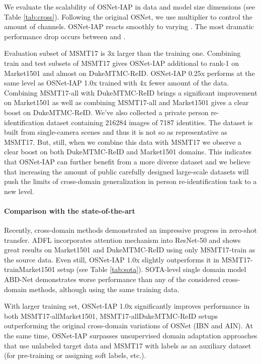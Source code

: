 \documentclass[a4paper,conference]{IEEEtran}
\begin{document}
We evaluate the scalability of OSNet-IAP in data and model size dimensions (see
Table \ref{tab:cross}).  Following the original OSNet, we use multiplier
 to control the amount of channels. OSNet-IAP
reacts smoothly to varying . The most dramatic performance drop occurs
between  and .

Evaluation subset of MSMT17 is 3x larger than the training one. Combining train
and test subsets of MSMT17 gives OSNet-IAP additional  to rank-1 on
Market1501 and almost  on DukeMTMC-ReID. OSNet-IAP 0.25x performs at the
same level as OSNet-IAP 1.0x trained with 4x fewer amount of the data. Combining
MSMT17-all with DukeMTMC-ReID brings a significant improvement on Market1501 as
well as combining MSMT17-all and Market1501 gives a clear boost on
DukeMTMC-ReID. We've also collected a private person re-identification dataset
containing 216284 images of 7187 identities. The dataset is built from
single-camera scenes and thus it is not so as representative as MSMT17. But,
still, when we combine this data with MSMT17 we observe a clear boost on both
DukeMTMC-ReID and Market1501 domains. This indicates that OSNet-IAP can further
benefit from a more diverse dataset and we believe that increasing the amount
of public carefully designed large-scale datasets will push the limits of cross-domain
generalization in person re-identification task to a new level.

\paragraph{Comparison with the state-of-the-art}\label{para:compare_sota}

Recently, cross-domain methods demonstrated an impressive progress in zero-shot
transfer. ADFL \cite{Liu2019AttentionAB} incorporates attention mechanism into ResNet-50 and
shows great results on Market1501 and DukeMTMC-ReID using only MSMT17-train as the source data. Even still,
OSNet-IAP 1.0x slightly outperforms it in MSMT17-trainMarket1501
setup (see Table \ref{tab:sota}). SOTA-level single domain model
ABD-Net \cite{abd} demonstrates worse performance than any of the considered cross-domain methods,
although using the same training data.

With larger training set, OSNet-IAP 1.0x significantly improves performance in
both MSMT17-allMarket1501, MSMT17-allDukeMTMC-ReID
setups outperforming the original cross-domain variations of OSNet (IBN and
AIN).  At the same time, OSNet-IAP surpasses unsupervised domain adaptation
approaches that use unlabeled target data and MSMT17 with labels as an auxiliary
dataset (for pre-training or assigning soft labels, etc.).
\end{document}
